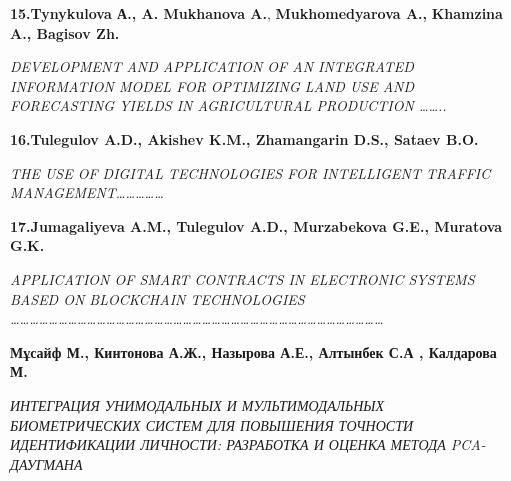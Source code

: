 {\bfseries 15.Tynykulova А., A. Mukhanova A.}, {\bfseries Mukhomedyarova A.,}
{\bfseries Khamzina A., Bagisov Zh.}

\emph{DEVELOPMENT AND APPLICATION OF AN INTEGRATED INFORMATION MODEL FOR
OPTIMIZING LAND USE AND FORECASTING YIELDS IN AGRICULTURAL PRODUCTION
\ldots\ldots..}

{\bfseries 16.Tulegulov A.D., Akishev K.M., Zhamangarin D.S., Sataev B.O.}

\emph{THE USE OF DIGITAL TECHNOLOGIES FOR INTELLIGENT TRAFFIC
MANAGEMENT\ldots\ldots\ldots\ldots\ldots{}}

{\bfseries 17.Jumagaliyeva A.M., Tulegulov A.D., Murzabekova G.E., Muratova
G.K.}

\emph{APPLICATION OF SMART CONTRACTS IN ELECTRONIC SYSTEMS BASED ON
BLOCKCHAIN TECHNOLOGIES
\ldots\ldots\ldots\ldots\ldots\ldots\ldots\ldots\ldots\ldots\ldots\ldots\ldots\ldots\ldots\ldots\ldots\ldots\ldots\ldots\ldots\ldots\ldots\ldots\ldots\ldots\ldots\ldots\ldots\ldots\ldots\ldots\ldots\ldots\ldots\ldots\ldots\ldots\ldots{}}

{\bfseries Мұсайф М., Кинтонова А.Ж., Назырова А.Е., Алтынбек С.А ,
Калдарова М.}

\emph{ИНТЕГРАЦИЯ УНИМОДАЛЬНЫХ И МУЛЬТИМОДАЛЬНЫХ БИОМЕТРИЧЕСКИХ СИСТЕМ
ДЛЯ ПОВЫШЕНИЯ ТОЧНОСТИ ИДЕНТИФИКАЦИИ ЛИЧНОСТИ: РАЗРАБОТКА И ОЦЕНКА
МЕТОДА PCA-ДАУГМАНА}
